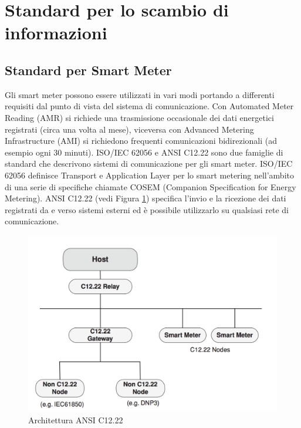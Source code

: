 \section{Standard per lo scambio di informazioni}
\subsection{Standard per Smart Meter}
Gli smart meter possono essere utilizzati in vari modi portando a differenti requisiti dal punto di vista del sistema di comunicazione. Con Automated Meter Reading (AMR) si richiede una trasmissione occasionale dei dati energetici registrati (circa una volta al mese), viceversa con  Advanced Metering Infrastructure (AMI) si richiedono frequenti comunicazioni bidirezionali (ad esempio ogni 30 minuti). ISO/IEC 62056 e ANSI C12.22 sono due famiglie di standard che descrivono sistemi di comunicazione per gli smart meter. ISO/IEC 62056 definisce Transport e Application Layer per lo smart metering nell'ambito di una serie di specifiche chiamate COSEM (Companion Specification for Energy Metering). ANSI C12.22 (vedi Figura \ref{fig:arch_c1222}) specifica l'invio e la ricezione dei dati registrati da e verso sistemi esterni ed è possibile utilizzarlo su qualsiasi rete di comunicazione.
\begin{figure}[h]
	\centering
	\includegraphics[scale=0.400]{imgs/arch_c1222.png}
	\caption{Architettura ANSI C12.22} \label{fig:arch_c1222}
\end{figure}
